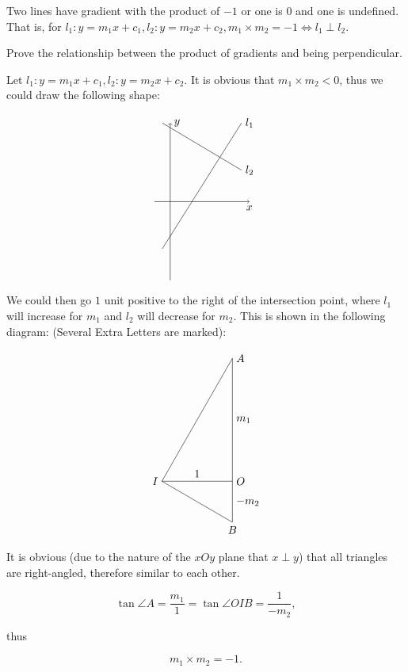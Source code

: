 \documentclass[8pt]{article}
\begin{document}
			\meth {} Two  lines have gradient with the product of \(-1\) or one is \(0\) and one is undefined. That is, for \(l_1: y = m_1 x + c_1, l_2: y = m_2 x + c_2, m_1 \times m_2 = -1 \Leftrightarrow l_1 \perp l_2\).

			\prob Prove the relationship between the product of gradients and being perpendicular.

			\solution Let \(l_1: y = m_1 x + c_1, l_2: y = m_2 x + c_2\). It is obvious that \(m_1 \times m_2 < 0\), thus we could draw the following shape:

			\[
				\begin{tikzpicture}[scale = 0.5]
					\draw [black, ->] (-1, 0)--(5, 0) node [below] {\(x\)};
					\draw [black, ->] (0, -5)--(0, 5) node [right] {\(y\)};
					\draw [black] (-0.5, -3)--(4.5, 5) node [right] {\(l_1\)};
					\draw [black] (-0.5, 5)--(4.5, 2) node[right] {\(l_2\)};
				\end{tikzpicture}
			\]

			We could then go \(1\) unit positive to the right of the intersection point, where \(l_1\) will increase for \(m_1\) and \(l_2\) will decrease for \(m_2\). This is shown in the following diagram: (Several Extra Letters are marked):

			\[
				\begin{tikzpicture}[scale = 0.75]
					\draw [black] (0, 0) -- (3, 0) node [right] {\(O\)};
					\draw [black] (3, 0) -- (3, {-sqrt(3)}) node [below] {\(B\)};
					\draw [black] (3, {-sqrt(3)}) -- (0, 0) node [left] {\(I\)};
					\draw [black] (3, 0) -- (3, {3 * sqrt(3)}) node [right] {\(A\)};
					\draw [black] (3, {3 * sqrt(3)}) -- (0, 0);
					\node at (1.5, 0) [anchor = south] {\(1\)};
					\node at (3, {-sqrt(3) / 2}) [anchor = west] {\(-m_2\)};
					\node at (3, {3 * sqrt(3) / 2}) [anchor = west] {\(m_1\)};
				\end{tikzpicture}
			\]

			It is obvious (due to the nature of the \(xOy\) plane that \(x \perp y\)) that all triangles are right-angled, therefore similar to each other.

			\[
				\tan \angle A = \frac{m_1}{1} = \tan \angle OIB = \frac{1}{-m_2},
			\]

			thus
			
			\[
				m_1 \times m_2 = -1.
			\]

			\begin{flushright}
				\qedsymbol
			\end{flushright}
\end{document}
